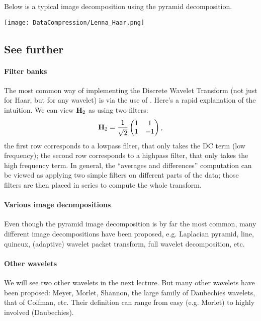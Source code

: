 Below is a typical image decomposition using the pyramid decomposition.

\begin{center}
    \texttt{[image: DataCompression/Lenna\_Haar.png]}
\end{center}


\subsection{See further}

\paragraph{Filter banks}
The most common way of implementing the Discrete Wavelet Transform (not just for Haar, but for any wavelet) is via the use of . Here's a rapid explanation of the intuition. We can view ${\bf H}_2$ as using two filters:
\[
    {\bf H}_2 = \frac{1}{\sqrt{2}} \begin{pmatrix}
    1 & 1\\
    1 & -1
    \end{pmatrix},
\]
the first row corresponds to a lowpass filter, that only takes the DC term (low frequency); the second row corresponds to a highpass filter, that only takes the high frequency term. In general, the ``averages and differences'' computation can be viewed as applying two simple filters on different parts of the data; those filters are then placed in series to compute the whole transform.

\paragraph{Various image decompositions}
Even though the pyramid image decomposition is by far the most common, many different image decompositions have been proposed, e.g. Laplacian pyramid, line, quincux, (adaptive) wavelet packet transform, full wavelet decomposition, etc.



\paragraph{Other wavelets}
We will see two other wavelets in the next lecture. But many other wavelets have been proposed: Meyer, Morlet, Shannon, the large family of Daubechies wavelets, that of Coifman, etc. Their definition can range from easy (e.g. Morlet) to highly involved (Daubechies). 



